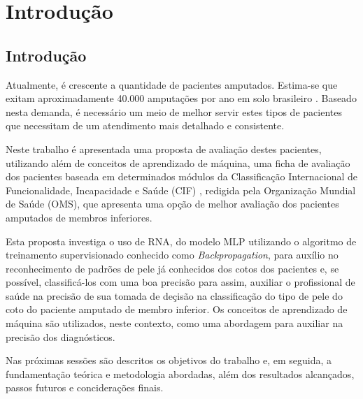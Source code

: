 \part{Introdução}
\chapter[Introdução]{Introdução}

Atualmente, é crescente a quantidade de pacientes amputados. Estima-se que exitam aproximadamente 40.000 amputações por ano em solo brasileiro \cite{Reis2012}. Baseado nesta demanda, é necessário um meio de melhor servir estes tipos de pacientes que necessitam de um atendimento mais detalhado e consistente.

Neste trabalho é apresentada uma proposta de avaliação destes pacientes,  utilizando além de conceitos de aprendizado de máquina, uma ficha de avaliação dos pacientes baseada em determinados módulos da Classificação Internacional de Funcionalidade, Incapacidade e Saúde (CIF) \cite{OMS2004}, redigida pela Organização Mundial de Saúde (OMS), que apresenta uma opção de melhor avaliação dos pacientes amputados de membros inferiores.

Esta proposta investiga o uso de RNA, do modelo MLP utilizando o algoritmo de treinamento supervisionado conhecido como \textit{Backpropagation}, para auxílio no reconhecimento de padrões de pele já conhecidos dos cotos dos pacientes e, se possível, classificá-los com uma boa precisão para assim, auxiliar o profissional de saúde na precisão de sua tomada de deçisão na classificação do tipo de pele do coto do paciente amputado de membro inferior. Os conceitos de aprendizado de máquina são utilizados, neste contexto, como uma abordagem para auxiliar na precisão dos diagnósticos.

Nas próximas sessões são descritos os objetivos do trabalho e, em seguida, a fundamentação teórica e metodologia abordadas, além dos resultados alcançados, passos futuros e conciderações finais.